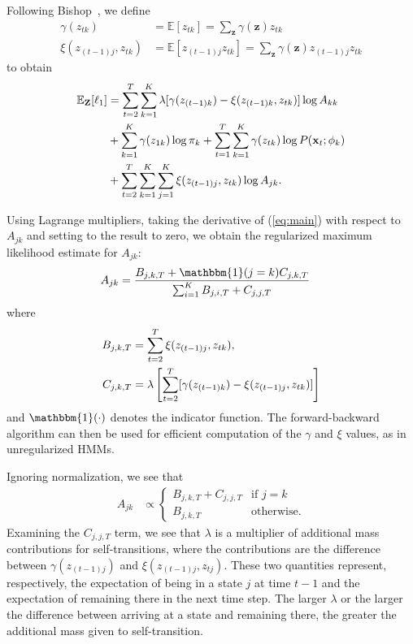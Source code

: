 \documentclass[letterpaper]{article}
\begin{document}
Following Bishop~\cite{bishop2007pattern}, we define
\begin{align*}
    \gamma(z_{tk}) &= \mathbb{E}[z_{tk}] = \sum_{\mathbf{z}}\gamma(\mathbf{z})z_{tk} \\
    \xi(z_{(t-1)j}, z_{tk}) &= \mathbb{E}[z_{(t-1)j}z_{tk}] = \sum_{\mathbf{z}}\gamma(\mathbf{z})z_{(t-1)j}z_{tk}
\end{align*}
to obtain
\begin{align}\label{eq:main}
    \mathbb{E}_{\mathbf{Z}}[\ell_1]
    &= \sum^{T}_{t=2}\sum^{K}_{k=1}\lambda[\gamma(z_{(t-1)k})-\xi(z_{(t-1)k}, z_{tk})]\log A_{kk} \notag\\
    &+ \sum_{k=1}^{K}\gamma(z_{1k})\log \pi_{k} + \sum_{t=1}^{T}\sum_{k=1}^{K} \gamma(z_{tk})\log P(\mathbf{x}_t ; \mathbf{\phi}_k) \notag\\
    &+ \sum_{t=2}^{T}\sum_{k=1}^{K}\sum_{j=1}^{K}\xi(z_{(t-1)j}, z_{tk})\log A_{jk}.
\end{align}

Using Lagrange multipliers, taking the derivative of (\ref{eq:main}) with
respect to $A_{jk}$ and setting to the result to zero, we obtain the regularized
maximum likelihood estimate for $A_{jk}$:
\begin{align}\label{eq:PSO-final}
    A_{jk} &= \frac{B_{j,k,T} + {\mathbbm{1}(j = k)}C_{j,k,T}} 
                   {\sum_{i=1}^{K} B_{j,i,T} + C_{j,j,T}}
\end{align}
where 
\begin{align}\label{eq:PSO-final-C-part}
    B_{j,k,T} &= \sum_{t=2}^{T} \xi(z_{(t-1)j}, z_{tk}), \notag\\
    C_{j,k,T} &= \lambda\left[\sum_{t=2}^{T}[\gamma(z_{(t-1)k}) - \xi(z_{(t-1)j}, z_{tk})]\right] 
\end{align}
and $\mathbbm{1}(\cdot)$ denotes the indicator function. The forward-backward
algorithm can then be used for efficient computation of the $\gamma$ and $\xi$
values, as in unregularized HMMs.

Ignoring normalization, we see that
\begin{align*}
    A_{jk} &\propto \begin{cases} 
                B_{j,k,T} + C_{j,j,T} & \mbox{if } j=k \\ 
                B_{j,k,T} & \mbox{otherwise.}
              \end{cases}
\end{align*}
Examining the $C_{j,j,T}$ term, we see that $\lambda$ is a multiplier of
additional mass contributions for self-transitions, where the contributions are
the difference between $\gamma(z_{(t-1)j})$ and $\xi(z_{(t-1)j}, z_{tj})$. These
two quantities represent, respectively, the expectation of being in a state $j$
at time $t-1$ and the expectation of remaining there in the next time step. The
larger $\lambda$ or the larger the difference between arriving at a state and
remaining there, the greater the additional mass given to self-transition.
\end{document}

